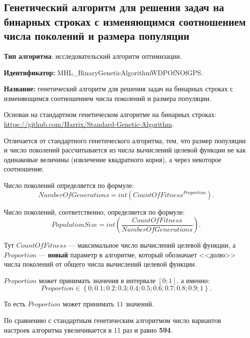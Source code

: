 \subsection{Генетический алгоритм для решения задач на бинарных строках с изменяющимся соотношением числа поколений и размера популяции}\label{HarrixOptimizationAlgorithms:MHL_BinaryGeneticAlgorithmWDPOfNOfGPS}

\textbf{Тип алгоритма}: исследовательский алгоритм оптимизации.

\textbf{Идентификатор:} MHL\_BinaryGeneticAlgorithmWDPOfNOfGPS.

\textbf{Название:} генетический алгоритм для решения задач на бинарных строках с изменяющимся соотношением числа поколений и размера популяции.

Основан на стандартном генетическом алгоритме на бинарных строках:  \href{https://github.com/Harrix/Standard-Genetic-Algorithm}{https://github.com/Harrix/Standard-Genetic-Algorithm}. 

Отличается от стандартного генетического алгоритма, тем, что размер популяции и число поколений рассчитывается из числа вычислений целевой функции не как одинаковые величины (извлечение квадратного корня), а через некоторое соотношение.

Число поколений определяется по формуле:
\begin{equation}
NumberOfGenerations = int \left( CountOfFitness^{Proportion}\right).
\end{equation}

Число поколений, соответственно, определяется по формуле:
\begin{equation}
PopulationSize = int \left( \dfrac{CountOfFitness}{NumberOfGenerations}\right).
\end{equation}


Тут $CountOfFitness$ --- максимальное число вычислений целевой функции, а $Proportion$ --- \textbf{новый} параметр в алгоритме, который обозначает <<долю>> числа поколений от общего числа вычислений целевой функции.

$Proportion$ может принимать значения в интервале $ [0;1] $, а именно:
\begin{equation}
Proportion \in \left\lbrace 0; 0.1; 0.2; 0.3; 0.4; 0.5; 0.6; 0.7; 0.8; 0.9; 1\right\rbrace .
\end{equation}

То есть $Proportion$ может принимать $ 11 $ значений.

По сравнению с стандартным генетическим алгоритмом число вариантов настроек алгоритма увеличивается в 11 раз и равно \textbf{594}.

